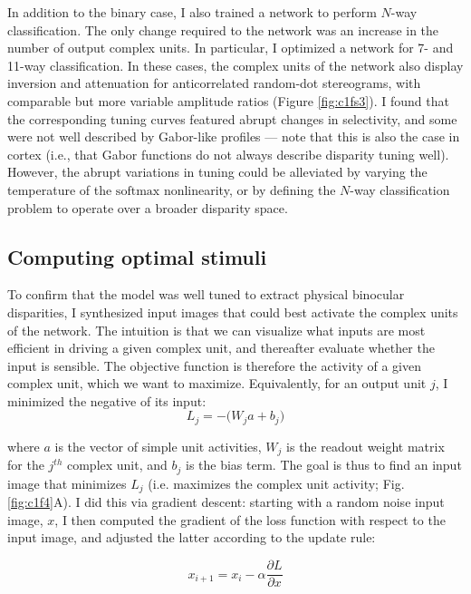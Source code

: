In addition to the binary case, I also trained a network to perform $N$-way classification. The only change required to the network was an increase in the number of output complex units. In particular, I optimized a network for 7- and 11-way classification. In these cases, the complex units of the network also display inversion and attenuation for anticorrelated random-dot stereograms, with comparable but more variable amplitude ratios (Figure \ref{fig:c1fs3}). I found that the corresponding tuning curves featured abrupt changes in selectivity, and some were not well described by Gabor-like profiles --- note that this is also the case in cortex (i.e., that Gabor functions do not always describe disparity tuning well). However, the abrupt variations in tuning could be alleviated by varying the temperature of the $\mathrm{softmax}$ nonlinearity, or by defining the $N$-way classification problem to operate over a broader disparity space.


\subsection*{Computing optimal stimuli}

To confirm that the model was well tuned to extract physical binocular disparities, I synthesized input images that could best activate the complex units of the network. The intuition is that we can visualize what inputs are most efficient in driving a given complex unit, and thereafter evaluate whether the input is sensible. The objective function is therefore the activity of a given complex unit, which we want to maximize. Equivalently, for an output unit $j$, I minimized the negative of its input:
\begin{equation}
  L_j = - \big( W_j a + b_j \big) 
  \label{eq:OptLoss}
\end{equation}

where $a$ is the vector of simple unit activities, $W_j$ is the readout weight matrix for the $j^{th}$ complex unit, and $b_j$ is the bias term. The goal is thus to find an input image that minimizes $L_j$ (i.e. maximizes the complex unit activity; Fig. \ref{fig:c1f4}A). I did this via gradient descent: starting with a random noise input image, $x$, I then computed the gradient of the loss function with respect to the input image, and adjusted the latter according to the update rule:

\begin{equation}
  x_{i+1} = x_i - \alpha\frac{\partial L}{\partial x}
\end{equation}

